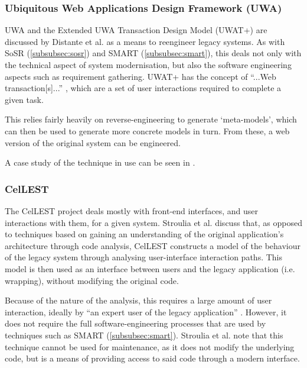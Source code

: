 \documentclass[12pt,journal,compsoc]{IEEEtran}
\begin{document}
\subsubsection{Ubiquitous Web Applications Design Framework (UWA)}
\label{subsubsec:uwa}
UWA \cite{UWAConsortium2002} and the Extended UWA Transaction Design Model (UWAT+) \cite{Distante2005} are discussed by Distante et al. \cite{Distante2006} as a means to reengineer legacy systems. As with SoSR (\autoref{subsubsec:sosr}) and SMART (\autoref{subsubsec:smart}), this deals not only with the technical aspect of system modernisation, but also the software engineering aspects such as requirement gathering. UWAT+ has the concept of ``...Web transaction[s]...'' \cite{Distante2006}, which are a set of user interactions required to complete a given task.

This relies fairly heavily on reverse-engineering to generate `meta-models', which can then be used to generate more concrete models in turn. From these, a web version of the original system can be engineered.

A case study of the technique in use can be seen in \cite{Distante:2006:RLA:1134285.1134353}.

\subsubsection{CelLEST}
\label{subsubsec:cellest}
The CelLEST project \cite{Stroulia2000} deals mostly with front-end interfaces, and user interactions with them, for a given system. Stroulia et al. \cite{Stroulia2002} discuss that, as opposed to techniques based on gaining an understanding of the original application's architecture through code analysis, CelLEST constructs a model of the behaviour of the legacy system through analysing user-interface interaction paths. This model is then used as an interface between users and the legacy application (i.e. wrapping), without modifying the original code.

Because of the nature of the analysis, this requires a large amount of user interaction, ideally by ``an expert user of the legacy application'' \cite{Stroulia2002}. However, it does not require the full software-engineering processes that are used by techniques such as SMART (\autoref{subsubsec:smart}). Stroulia et al. note that this technique cannot be used for maintenance, as it does not modify the underlying code, but is a means of providing access to said code through a modern interface.
\end{document}
